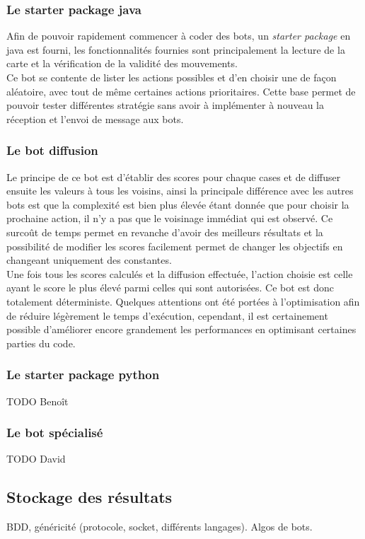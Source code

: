 \documentclass[a4paper,12pt]{article}
\begin{document}
\subsubsection{Le starter package java}
Afin de pouvoir rapidement commencer à coder des bots, un \emph{starter package}
en java est fourni, les fonctionnalités fournies sont principalement la lecture
de la carte et la vérification de la validité des mouvements.
\\
Ce bot se contente de lister les actions possibles et d'en choisir une de façon
aléatoire, avec tout de même certaines actions prioritaires. Cette base permet
de pouvoir tester différentes stratégie sans avoir à implémenter à nouveau la
réception et l'envoi de message aux bots.

\subsubsection{Le bot diffusion}
Le principe de ce bot est d'établir des scores pour chaque cases et de diffuser
ensuite les valeurs à tous les voisins, ainsi la principale différence avec les
autres bots est que la complexité est bien plus élevée étant donnée que pour
choisir la prochaine action, il n'y a pas que le voisinage immédiat qui est
observé. Ce surcoût de temps permet en revanche d'avoir des meilleurs résultats
et la possibilité de modifier les scores facilement permet de changer les
objectifs en changeant uniquement des constantes.
\\
Une fois tous les scores calculés et la diffusion effectuée, l'action choisie
est celle ayant le score le plus élevé parmi celles qui sont autorisées. Ce bot
est donc totalement déterministe. Quelques attentions ont été portées à
l'optimisation afin de réduire légèrement le temps d'exécution, cependant, il
est certainement possible d'améliorer encore grandement les performances en
optimisant certaines parties du code.

\subsubsection{Le starter package python}
TODO Benoît

\subsubsection{Le bot spécialisé}
TODO David

\subsection{Stockage des résultats}
BDD, généricité (protocole, socket, différents langages).
Algos de bots.
\end{document}
